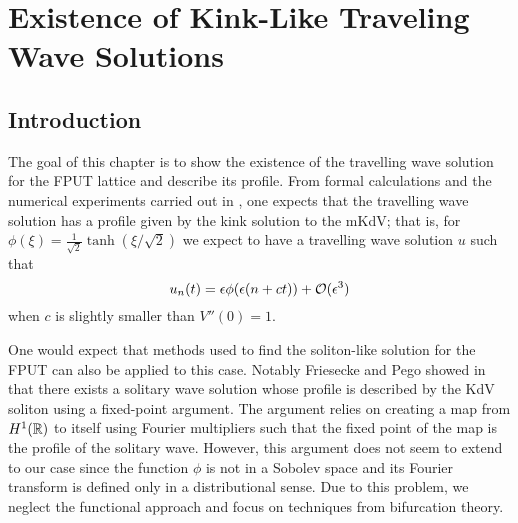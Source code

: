 \chapter{Existence of Kink-Like Traveling Wave Solutions}
\label{chp:existence}
\pagestyle{myheadings}

\section{Introduction}
The goal of this chapter is to show the existence of the travelling wave solution for the FPUT lattice and describe its profile. From formal calculations and the numerical experiments carried out in \cite{pace2019beta}, one expects that the travelling wave solution has a profile given by the kink solution to the mKdV; that is, for \(\phi(\xi) = \frac 1 {\sqrt 2} \tanh(\xi/\sqrt 2)\) we expect to have a travelling wave solution \(u\) such that 
\begin{equation}\label{formal-approximation}
	u_n(t) = \epsilon \phi(\epsilon(n + ct)) +\mathcal{O}(\epsilon^3)
\end{equation}
when \(c\) is slightly smaller than \(V''(0) = 1\).

One would expect that methods used to find the soliton-like solution for the FPUT can also be applied to this case. Notably Friesecke and Pego showed in \cite{friesecke1999solitary} that there exists a solitary wave solution whose profile is described by the KdV soliton using a fixed-point argument. The argument relies on creating a map from \(H^1(\mathbb{R})\) to itself using Fourier multipliers such that the fixed point of the map is the profile of the solitary wave. However, this argument does not seem to extend to our case since the function \(\phi\) is not in a Sobolev space and its Fourier transform is defined only in a distributional sense. Due to this problem, we neglect the functional approach and focus on techniques from bifurcation theory. 


